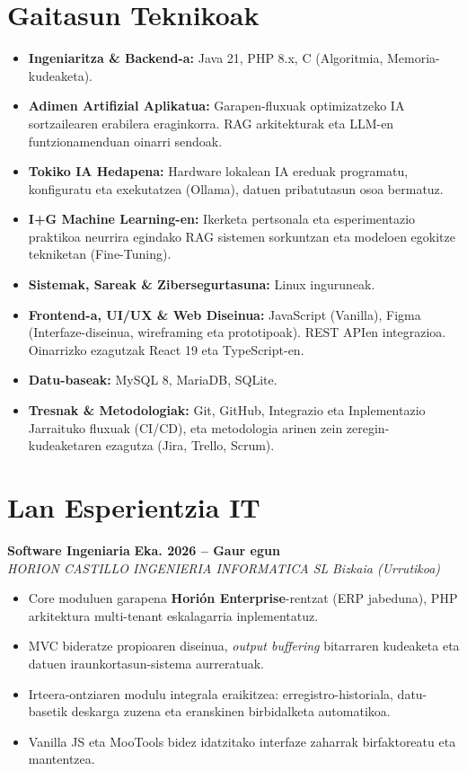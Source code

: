 \documentclass[a4paper,10pt]{article}
\newcommand{\jobheader}[4]{
    \noindent\textbf{#1} \hfill \textbf{#2} \\
    \textit{#3} \hfill \textit{#4} \vspace{3pt}
}
\begin{document}
\section{Gaitasun Teknikoak}
\begin{itemize}[leftmargin=0pt, label={}, itemsep=3pt, topsep=4pt]
    \item \textbf{Ingeniaritza \& Backend-a:} Java 21, PHP 8.x, C (Algoritmia, Memoria-kudeaketa).
    \item \textbf{Adimen Artifizial Aplikatua:} Garapen-fluxuak optimizatzeko IA sortzailearen erabilera eraginkorra. RAG arkitekturak eta LLM-en funtzionamenduan oinarri sendoak.
    \item \textbf{Tokiko IA Hedapena:} Hardware lokalean IA ereduak programatu, konfiguratu eta exekutatzea (Ollama), datuen pribatutasun osoa bermatuz.
    \item \textbf{I+G Machine Learning-en:} Ikerketa pertsonala eta esperimentazio praktikoa neurrira egindako RAG sistemen sorkuntzan eta modeloen egokitze tekniketan (Fine-Tuning).
    \item \textbf{Sistemak, Sareak \& Zibersegurtasuna:} Linux inguruneak.
    \item \textbf{Frontend-a, UI/UX \& Web Diseinua:} JavaScript (Vanilla), Figma (Interfaze-diseinua, wireframing eta prototipoak). REST APIen integrazioa. Oinarrizko ezagutzak React 19 eta TypeScript-en.
    \item \textbf{Datu-baseak:} MySQL 8, MariaDB, SQLite.
    \item \textbf{Tresnak \& Metodologiak:} Git, GitHub, Integrazio eta Inplementazio Jarraituko fluxuak (CI/CD), eta metodologia arinen zein zeregin-kudeaketaren ezagutza (Jira, Trello, Scrum).
\end{itemize}

\section{Lan Esperientzia IT}

\jobheader{Software Ingeniaria}{Eka. 2026 -- Gaur egun}{HORION CASTILLO INGENIERIA INFORMATICA SL}{Bizkaia (Urrutikoa)}
\begin{itemize}[leftmargin=12pt, itemsep=3pt, topsep=4pt]
    \item Core moduluen garapena \textbf{Horión Enterprise}-rentzat (ERP jabeduna), PHP arkitektura multi-tenant eskalagarria inplementatuz.
    \item MVC bideratze propioaren diseinua, \textit{output buffering} bitarraren kudeaketa eta datuen iraunkortasun-sistema aurreratuak.
    \item Irteera-ontziaren modulu integrala eraikitzea: erregistro-historiala, datu-basetik deskarga zuzena eta eranskinen birbidalketa automatikoa.
    \item Vanilla JS eta MooTools bidez idatzitako interfaze zaharrak birfaktoreatu eta mantentzea.
\end{itemize}
\end{document}
